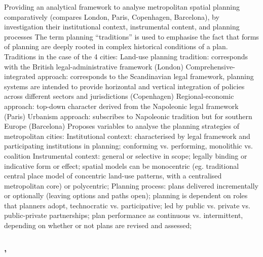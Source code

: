 \documentclass{article}
\begin{document}
\begin{outline}
	\1 Providing an analytical framework to analyse metropolitan spatial planning comparatively (compares London, Paris, Copenhagen, Barcelona), by investigation their institutional context, instrumental content, and planning processes
	\1 The term planning ``traditions'' is used to emphasise the fact that forms of planning are deeply rooted in complex historical conditions of a plan. Traditions in the case of the 4 cities:
		\2 Land-use planning tradition: corresponds with the British legal-administrative framework (London)
		\2 Comprehensive-integrated approach: corresponds to the Scandinavian legal framework, planning systems are intended to provide horizontal and vertical integration of policies across different sectors and jurisdictions (Copenhagen)
		\2 Regional-economic approach: top-down character derived from the Napoleonic legal framework (Paris)
		\2 Urbanism approach: subscribes to Napoleonic tradition but for southern Europe (Barcelona)
	\1 Proposes variables to analyse the planning strategies of metropolitan cities:
		\2 Institutional context: characterised by legal framework and participating institutions in planning; conforming vs. performing, monolithic vs. coalition
		\2 Instrumental context: general or selective in scope; legally binding or indicative form or effect; spatial models can be monocentric (eg. traditional central place model of concentric land-use patterns, with a centralised metropolitan core) or polycentric; 
		\2 Planning process: plans delivered incrementally or optionally (leaving options and paths open); planning is dependent on roles that planners adopt, technocratic vs. participative; led by public vs. private vs. public-private partnerships; plan performance as continuous vs. intermittent, depending on whether or not plans are revised and assessed;
\end{outline}





\subsubsection{, \textit{}}

\begin{outline}
	\1
\end{outline}


\fi
\end{document}
